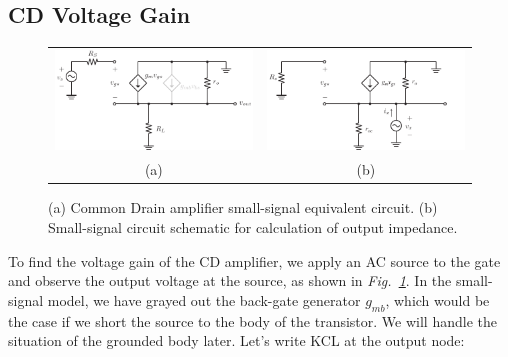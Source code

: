 \subsection{CD Voltage Gain}
\begin{figure}[tb]
\centering
\begin{tabular}{cc}
\includegraphics[scale=.7]{cd_amp_ss_av2} &
\includegraphics[scale=.7]{cd_amp_ss_rout}\\
(a) & (b)\\
\end{tabular}
\caption{(a) Common Drain amplifier small-signal equivalent circuit.  (b)  Small-signal circuit schematic for calculation of output impedance.}
\label{fig:cd_amp_ss_av2}
\end{figure}
To find the voltage gain of the CD amplifier, we apply an AC source to the gate and observe the output voltage at the source, as shown in \emph{Fig.~\ref{fig:cd_amp_ss_av2}}.  In the small-signal model, we have grayed out the back-gate generator $g_{mb}$, which would be the case if we short the source to the body of the transistor.  We will handle the situation of the grounded body later. Let's write KCL at the output node:
